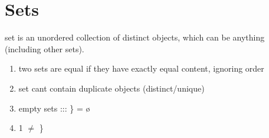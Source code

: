 \documentclass{article}
\begin{document}
\section{Sets}
set is an unordered collection of distinct objects, which can be anything
(including other sets).
\begin{enumerate}
    \item two sets are equal if they have exactly equal content, ignoring
        order
    \item set cant contain duplicate objects (distinct/unique)
    \item empty sets ::: \textbraceleft\} = \o 
    \item 1 $\neq$ \}
\end{enumerate}
\end{document}
